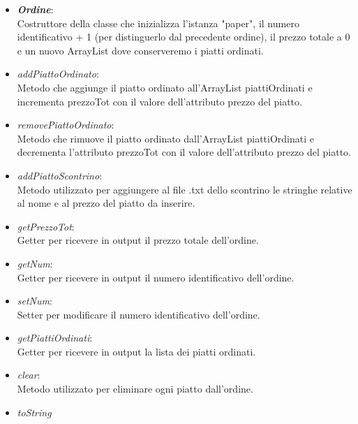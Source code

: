 \documentclass{article}
\begin{document}
\begin{itemize}
\begin{itemize}
            \begin{itemize}
                \item \textbf{\textit{Ordine}}: \\Costruttore della classe che inizializza l'istanza "paper", il numero identificativo + 1 (per distinguerlo dal precedente ordine), il prezzo totale a 0 e un nuovo ArrayList dove conserveremo i piatti ordinati.\\
                \item \textit{addPiattoOrdinato}: \\Metodo che aggiunge il piatto ordinato all'ArrayList piattiOrdinati e incrementa prezzoTot con il valore dell'attributo prezzo del piatto.\\ 
                \item \textit{removePiattoOrdinato}: \\Metodo che rimuove il piatto ordinato dall'ArrayList piattiOrdinati e decrementa l'attributo prezzoTot con il valore dell'attributo prezzo del piatto.\\ 
                \item \textit{addPiattoScontrino}: \\Metodo utilizzato per aggiungere al file .txt dello scontrino le stringhe relative al nome e al prezzo del piatto da inserire.\\ 
                \item \textit{getPrezzoTot}: \\Getter per ricevere in output il prezzo totale dell'ordine.\\
                \item \textit{getNum}: \\Getter per ricevere in output il numero identificativo dell'ordine.\\
                \item \textit{setNum}: \\Setter per modificare il numero identificativo dell'ordine.\\
                \item \textit{getPiattiOrdinati}: \\Getter per ricevere in output la lista dei piatti ordinati.\\ 
                \item \textit{clear}: \\Metodo utilizzato per eliminare ogni piatto dall'ordine.\\ 
                \item \textit{toString} \\
             

\end{itemize}
\end{itemize}
\end{itemize}
\end{document}
